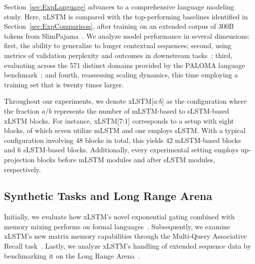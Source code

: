 Section~\ref{sec:ExpLanguage} advances to a comprehensive language modeling study. Here, xLSTM is compared with the top-performing baselines identified in Section~\ref{sec:ExpComparison}, after training on an extended corpus of 300B tokens from SlimPajama~\citep{Soboleva:23}. We analyze model performance in several dimensions: first, the ability to generalize to longer contextual sequences; second, using metrics of validation perplexity and outcomes in downstream tasks~\citep{Sutawika:24}; third, evaluating across the 571 distinct domains provided by the PALOMA language benchmark~\citep{Magnusson:23arxivshort}; and fourth, reassessing scaling dynamics, this time employing a training set that is twenty times larger.

\label{sec:xlstm_blocks_notation}
Throughout our experiments, we denote xLSTM[$a$:$b$] as the configuration where the fraction $a/b$ represents the number of mLSTM-based to sLSTM-based xLSTM blocks. For instance, xLSTM[7:1] corresponds to a setup with eight blocks, of which seven utilize mLSTM and one employs sLSTM. With a typical configuration involving 48 blocks in total, this yields 42 mLSTM-based blocks and 6 sLSTM-based blocks. Additionally, every experimental setting employs up-projection blocks before mLSTM modules and after sLSTM modules, respectively.

\subsection{Synthetic Tasks and Long Range Arena}
\label{sec:ExpSyntethic}
Initially, we evaluate how xLSTM’s novel exponential gating combined with memory mixing performs on formal languages~\citep{Deletang:23}. Subsequently, we examine xLSTM’s new matrix memory capabilities through the Multi-Query Associative Recall task~\citep{Arora:23arxiv}. Lastly, we analyze xLSTM’s handling of extended sequence data by benchmarking it on the Long Range Arena~\citep{Tay:21}.

